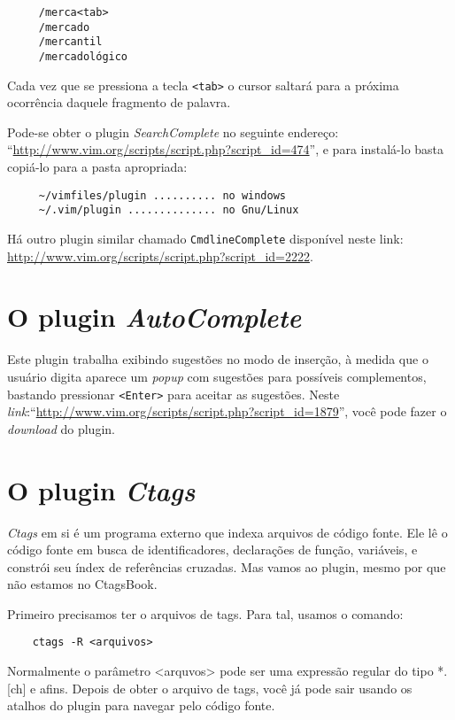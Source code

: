 \begin{verbatim}
     /merca<tab>
     /mercado
     /mercantil
     /mercadológico
\end{verbatim}

Cada vez que se pressiona a tecla {\tt <tab>} o cursor saltará para 
a próxima ocorrência daquele fragmento de palavra.

Pode-se obter o plugin {\em SearchComplete} no seguinte endereço: 
``\url{http://www.vim.org/scripts/script.php?script\_id=474}'', 
e para instalá-lo basta copiá-lo para a pasta apropriada:
    
\begin{verbatim}
     ~/vimfiles/plugin .......... no windows
     ~/.vim/plugin .............. no Gnu/Linux
\end{verbatim}

Há outro plugin similar chamado {\tt CmdlineComplete} disponível neste link:
\url{http://www.vim.org/scripts/script.php?script\_id=2222}.


\section{O plugin {\em AutoComplete}}
\label{sec:O Plugin AutoComplete}

Este plugin trabalha exibindo sugestões no modo de inserção, à
medida que o usuário digita aparece um {\em popup} com sugestões para possíveis
complementos, bastando pressionar {\tt <Enter>} para aceitar as sugestões.
Neste {\em link}:``\url{http://www.vim.org/scripts/script.php?script\_id=1879}'', você pode
fazer o {\em download} do plugin.

\section{O plugin {\em Ctags}}
\label{sec:O Plugin Ctags}

{\em Ctags} em si é um programa externo que indexa arquivos de código fonte. Ele lê
o código fonte em busca de identificadores, declarações de função, variáveis, e constrói seu 
índex de referências cruzadas. Mas vamos ao plugin, mesmo por que não estamos no CtagsBook.

Primeiro precisamos ter o arquivos de tags. Para tal, usamos o comando:

\begin{verbatim}
    ctags -R <arquivos>
\end{verbatim}

Normalmente o parâmetro <arquvos> pode ser uma expressão regular do tipo *.[ch] e afins. Depois
de obter o arquivo de tags, você já pode sair usando os atalhos do plugin para navegar pelo 
código fonte. 

